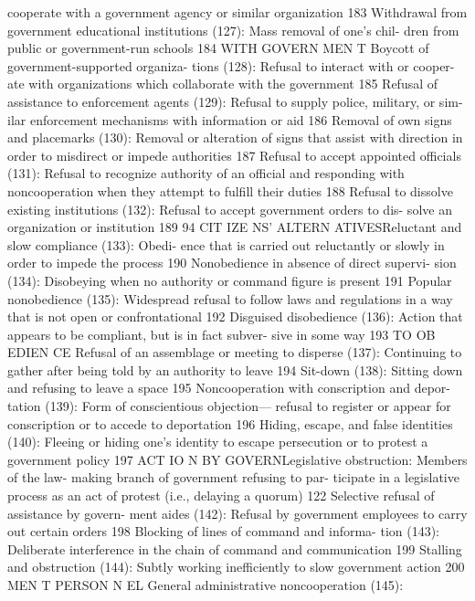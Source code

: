 \documentclass[twoside,a4paper,12pt,fleqn,openany]{extbook}
\begin{document}
cooperate with a government agency or similar
organization
 183
Withdrawal from government educational
institutions (127): Mass removal of one’s chil-
dren from public or government-run schools		
184
WITH GOVERN MEN T
Boycott of government-supported organiza-
tions (128): Refusal to interact with or cooper-
ate with organizations which collaborate with
the government
 185
Refusal of assistance to enforcement agents
(129): Refusal to supply police, military, or sim-
ilar enforcement mechanisms with information
or aid
 186
Removal of own signs and placemarks (130):
Removal or alteration of signs that assist with
direction in order to misdirect or impede
authorities
 187
Refusal to accept appointed officials (131):
Refusal to recognize authority of an official and
responding with noncooperation when they
attempt to fulfill their duties
 188
Refusal to dissolve existing institutions (132):
Refusal to accept government orders to dis-
solve an organization or institution
 189
94
CIT IZE NS’ ALTERN ATIVESReluctant and slow compliance (133): Obedi-
ence that is carried out reluctantly or slowly in
order to impede the process
 190
Nonobedience in absence of direct supervi-
sion (134): Disobeying when no authority or
command figure is present
 191
Popular nonobedience (135): Widespread
refusal to follow laws and regulations in a way
that is not open or confrontational
 192
Disguised disobedience (136): Action that
appears to be compliant, but is in fact subver-
sive in some way
 193
TO OB EDIEN CE
Refusal of an assemblage or meeting to
disperse (137): Continuing to gather after being
told by an authority to leave
 194
Sit-down (138): Sitting down and refusing to
leave a space
 195
Noncooperation with conscription and depor-
tation (139): Form of conscientious objection—
refusal to register or appear for conscription or
to accede to deportation
 196
Hiding, escape, and false identities (140):
Fleeing or hiding one’s identity to escape
persecution or to protest a government
policy
 197
ACT IO N BY GOVERNLegislative obstruction: Members of the law-
making branch of government refusing to par-
ticipate in a legislative process as an act of
protest (i.e., delaying a quorum)
 122
Selective refusal of assistance by govern-
ment aides (142): Refusal by government
employees to carry out certain orders
 198
Blocking of lines of command and informa-
tion (143): Deliberate interference in the chain
of command and communication
 199
Stalling and obstruction (144): Subtly working
inefficiently to slow government action 200
MEN T PERSON N EL
General administrative noncooperation (145):
\end{document}
